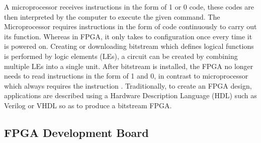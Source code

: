 
A microprocessor receives instructions in the form of 1 or 0 code, these codes are then interpreted by the computer to execute the given command. The Microprocessor requires instructions in the form of code continuously to carry out its function. Whereas in FPGA, it only takes to configuration once every time it is powered on. Creating or downloading bitstream which defines logical functions is performed by logic elements (LEs), a circuit can be created by combining multiple LEs into a single unit. After bitstream is installed, the FPGA no longer needs to read instructions in the form of 1 and 0, in contrast to microprocessor which always requires the instruction \cite{pdf:cheung}. Traditionally, to create an FPGA design, applications are described using a Hardware Description Language (HDL) such as Verilog or VHDL so as to produce a bitstream FPGA.


\subsection{FPGA Development Board}


